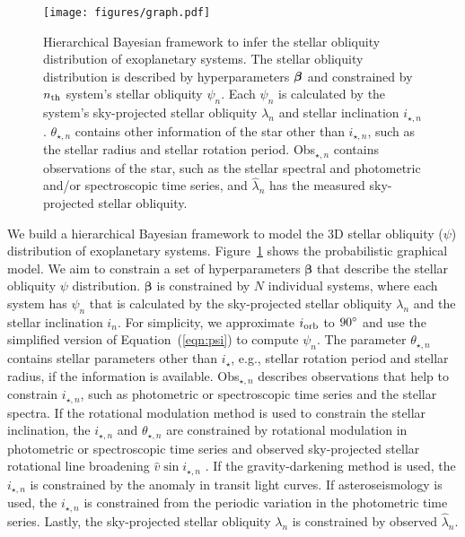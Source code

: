 \documentclass[twocolumn,times]{aastex631}
\begin{document}
\begin{figure}[ht!]
    \texttt{[image: figures/graph.pdf]}
    \caption{Hierarchical Bayesian framework to infer the stellar obliquity distribution of exoplanetary systems. The stellar obliquity distribution is described by hyperparameters $\vb*{\beta}$ and constrained by $n_{\rm th}$ system's stellar obliquity $\psi_n$. Each $\psi_n$ is calculated by the system's sky-projected stellar obliquity $\lambda_n$ and stellar inclination $i_{\star, n}$. $\theta_{\star, n}$ contains other information of the star other than $i_{\star, n}$, such as the stellar radius and stellar rotation period. Obs$_{\star,n}$ contains observations of the star, such as the stellar spectral and photometric and/or spectroscopic time series, and $\hat{\lambda}_n$ has the measured sky-projected stellar obliquity.}
    \label{fig:graph}
\end{figure}

We build a hierarchical Bayesian framework to model the 3D stellar obliquity ($\psi$) distribution of exoplanetary systems. Figure~\ref{fig:graph} shows the probabilistic graphical model. We aim to constrain a set of hyperparameters $\bm{\beta}$ that describe the stellar obliquity $\psi$ distribution. $\bm{\beta}$ is constrained by $N$ individual systems, where each system has $\psi_n$ that is calculated by the sky-projected stellar obliquity $\lambda_n$ and the stellar inclination $i_n$. For simplicity, we approximate $i_{\rm orb}$ to $90\mbox{$^\circ$}$ and use the simplified version of Equation~(\ref{eqn:psi}) to compute $\psi_n$.
The parameter $\theta_{\star, n}$ contains stellar parameters other than $i_\star$, e.g., stellar rotation period and stellar radius, if the information is available.
Obs$_{\star,n}$ describes observations that help to constrain $i_{\star,n}$, such as photometric or spectroscopic time series and the stellar spectra. If the rotational modulation method is used to constrain the stellar inclination, the $i_{\star,n}$ and $\theta_{\star,n}$ are constrained by rotational modulation in photometric or spectroscopic time series and observed sky-projected stellar rotational line broadening $\hat{v}\sin{i_{\star,n}}$ \citep[e.g.,][]{Masuda20}. If the gravity-darkening method is used, the $i_{\star,n}$ is constrained by the anomaly in transit light curves. If asteroseismology is used, the $i_{\star,n}$ is constrained from the periodic variation in the photometric time series.
Lastly, the sky-projected stellar obliquity $\lambda_n$ is constrained by observed $\hat{\lambda}_n$.
\end{document}
